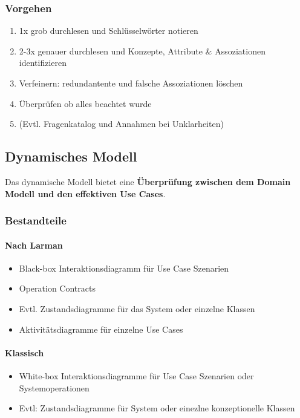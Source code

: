 \subsubsection{Vorgehen}
\begin{enumerate}
	\item 1x grob durchlesen und Schlüsselwörter notieren
	\item 2-3x genauer durchlesen und Konzepte, Attribute \& Assoziationen identifizieren
	\item Verfeinern: redundantente und falsche Assoziationen löschen
	\item Überprüfen ob alles beachtet wurde
	\item (Evtl. Fragenkatalog und Annahmen bei Unklarheiten)
\end{enumerate}

\subsection{Dynamisches Modell}
Das dynamische Modell bietet eine \textbf{Überprüfung zwischen dem Domain Modell und den effektiven Use Cases}.

\subsubsection{Bestandteile}
\paragraph{Nach Larman}
\begin{itemize}
	\item Black-box Interaktionsdiagramm für Use Case Szenarien
	\item Operation Contracts
	\item Evtl. Zustandsdiagramme für das System oder einzelne Klassen
	\item Aktivitätsdiagramme für einzelne Use Cases
\end{itemize}

\paragraph{Klassisch}
\begin{itemize}
	\item White-box Interaktionsdiagramme für Use Case Szenarien oder Systemoperationen
	\item Evtl: Zustandsdiagramme für System oder einezlne konzeptionelle Klassen
\end{itemize}

